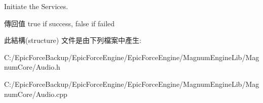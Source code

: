 Initiate the Services. 

\begin{DoxyReturn}{傳回值}
true if success, false if failed 
\end{DoxyReturn}


此結構(structure) 文件是由下列檔案中產生\+:\begin{DoxyCompactItemize}
\item 
C\+:/\+Epic\+Force\+Backup/\+Epic\+Force\+Engine/\+Epic\+Force\+Engine/\+Magnum\+Engine\+Lib/\+Magnum\+Core/Audio.\+h\item 
C\+:/\+Epic\+Force\+Backup/\+Epic\+Force\+Engine/\+Epic\+Force\+Engine/\+Magnum\+Engine\+Lib/\+Magnum\+Core/Audio.\+cpp\end{DoxyCompactItemize}
